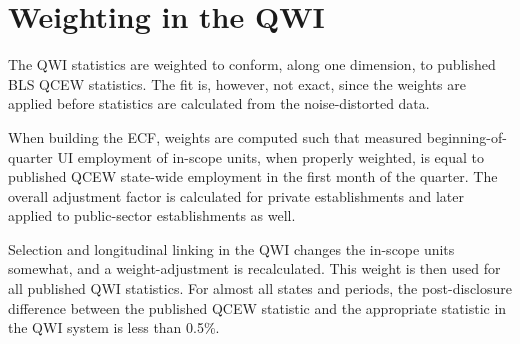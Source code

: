 \section{Weighting in the QWI}
\label{sec:weights}

The QWI statistics are weighted to conform, along one dimension, to
published BLS QCEW statistics. The fit is, however, not exact, since the
weights are applied before statistics are calculated from the
noise-distorted data. 

When building the ECF, weights are computed such that measured
beginning-of-quarter UI employment
of in-scope units, when properly weighted, is equal to published QCEW
state-wide employment in the first month of the quarter.
%
The overall adjustment factor is calculated for private establishments and
later applied to public-sector establishments as well. %

Selection and longitudinal linking in the QWI changes the in-scope units
somewhat, and a weight-adjustment is recalculated. This weight is then used
for all published QWI statistics. For almost all states and periods, the
post-disclosure difference between the published QCEW statistic and the
appropriate statistic in the QWI system is less than 0.5\%. 


